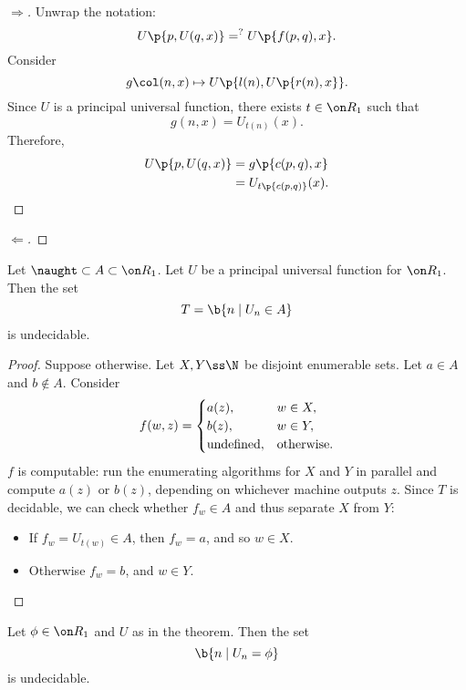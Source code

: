 \begin{proof}[$\Rightarrow$]
  Unwrap the notation:
  $$ U\p{p, U(q, x)} =^? U\p{f(p, q), x}. $$
  Consider
  $$ g \col (n, x) \mapsto U\p{l(n), U\p{r(n), x}}. $$
  Since $U$ is a principal universal function, there exists $t \in \Comp_1$ such that
  $$ g(n, x) = U_{t(n)}(x). $$
  Therefore,
  \begin{align*}
    U\p{p, U(q, x)}
    &= g\p{c(p, q), x} \\
    &= U_{t\p{c(p, q)}}(x). \\
  \end{align*}
\end{proof}

\begin{proof}[$\Leftarrow$]
  
  \wtf
  
\end{proof}

\begin{theorem}
  Let $\naught \subset A \subset \Comp_1$.
  Let $U$ be a principal universal function for $\Comp_1$.
  Then the set
  $$ T = \b{n \mid U_n \in A} $$
  is undecidable.
\end{theorem}

\begin{proof}
  Suppose otherwise.
  Let $X, Y \ss \N$ be disjoint enumerable sets.
  Let $a \in A$ and $b \not\in A$.
  Consider
  $$
  f(w, z) = \begin{cases}
    a(z), & w \in X, \\
    b(z), & w \in Y, \\
    \text{undefined}, & \text{otherwise}.
  \end{cases}
  $$
  $f$ is computable: run the enumerating algorithms for $X$ and $Y$ in parallel and compute $a(z)$ or $b(z)$, depending on whichever machine outputs $z$.
  Since $T$ is decidable, we can check whether $f_w \in A$ and thus separate $X$ from $Y$:
  \begin{itemize}
    \item If $f_w = U_{t(w)} \in A$, then $f_w = a$, and so $w \in X$.
    \item Otherwise $f_w = b$, and $w \in Y$.
  \end{itemize}
\end{proof}

\begin{corollary}
  Let $\phi \in \Comp_1$ and $U$ as in the theorem.
  Then the set
  $$ \b{n \mid U_n = \phi} $$
  is undecidable.
\end{corollary}

